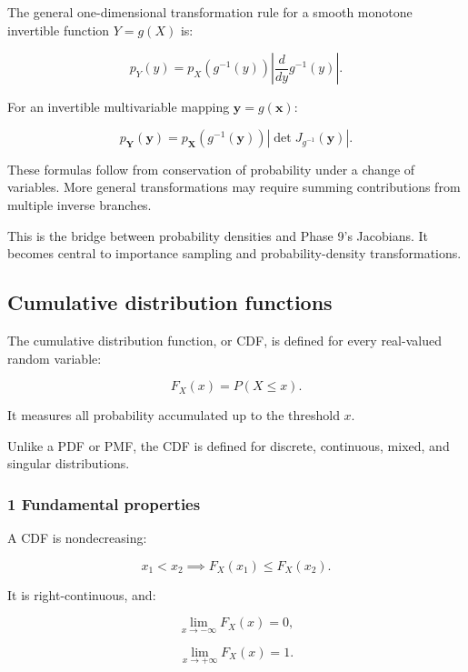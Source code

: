 The general one-dimensional transformation rule for a smooth monotone invertible function \(Y=g(X)\) is:

\[
 \boxed{ p_Y(y) = p_X(g^{-1}(y)) \left| \frac{d}{dy}g^{-1}(y) \right| }.
\]

For an invertible multivariable mapping \(\mathbf y=g(\mathbf x)\):

\[
 \boxed{ p_{\mathbf Y}(\mathbf y) = p_{\mathbf X}(g^{-1}(\mathbf y)) \left| \det J_{g^{-1}}(\mathbf y) \right| }.
\]

These formulas follow from conservation of probability under a change of variables. More general transformations may require summing contributions from multiple inverse branches.

This is the bridge between probability densities and Phase 9's Jacobians. It becomes central to importance sampling and probability-density transformations.

\subsection{Cumulative distribution functions}\label{02-foundations-ii-ch023-cumulative-distribution-functions}

\hypertarget{02-foundations-ii-ch023-cumulative-distribution-functions}{}

The cumulative distribution function, or CDF, is defined for every real-valued random variable:

\[
 \boxed{ F_X(x)=P(X\le x) }.
\]

It measures all probability accumulated up to the threshold \(x\).

Unlike a PDF or PMF, the CDF is defined for discrete, continuous, mixed, and singular distributions.

\subsubsection{1 Fundamental properties}\label{02-foundations-ii-ch023-fundamental-properties}

\hypertarget{02-foundations-ii-ch023-fundamental-properties}{}

A CDF is nondecreasing:

\[
 x_1<x_2 \implies F_X(x_1)\le F_X(x_2).
\]

It is right-continuous, and:

\[
 \lim_{x\to-\infty}F_X(x)=0,
\]

\[
 \lim_{x\to+\infty}F_X(x)=1.
\]

